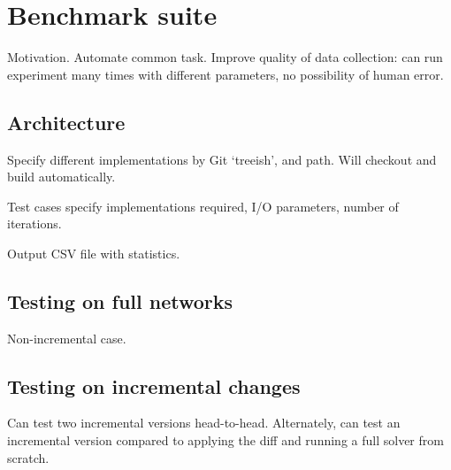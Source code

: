 \section{Benchmark suite} \label{sec:impl-benchmark}


Motivation. Automate common task. Improve quality of data collection: can run experiment many times with different parameters, no possibility of human error. 

\subsection{Architecture}

Specify different implementations by Git `treeish', and path. Will checkout and build automatically. 

Test cases specify implementations required, I/O parameters, number of iterations.

Output CSV file with statistics.

\subsection{Testing on full networks}

Non-incremental case.

\subsection{Testing on incremental changes}

Can test two incremental versions head-to-head. Alternately, can test an incremental version compared to applying the diff and running a full solver from scratch.